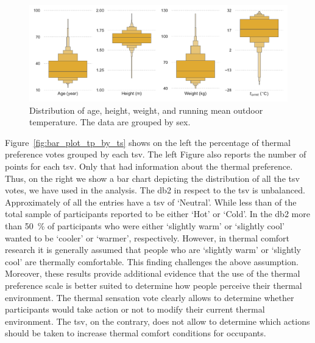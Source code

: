 \begin{figure}
    \centering
    \includegraphics[width=\textwidth]{figures/dist_other_data}
    \caption{Distribution of age, height, weight, and running mean outdoor temperature.
    The data are grouped by sex.}
    \label{fig:dist_other_data}
\end{figure}

Figure~\ref{fig:bar_plot_tp_by_ts} shows on the left the percentage of thermal preference votes grouped by each \ac{tsv}.
The left Figure also reports the number of points for each \ac{tsv}.
Only  that had information about the thermal preference.
Thus, on the right we show a bar chart depicting the distribution of all the \ac{tsv} votes, we have used in the analysis.
The \gls{db2} in respect to the \ac{tsv} is unbalanced.
Approximately  of all the entries have a \ac{tsv} of `Neutral'.
While less than  of the total sample of participants reported to be either `Hot' or `Cold'.
In the \gls{db2} more than \qty{50}{\percent} of participants who were either `slightly warm' or `slightly cool' wanted to be `cooler' or `warmer', respectively.
However, in thermal comfort research it is generally assumed that people who are `slightly warm' or `slightly cool' are thermally comfortable.
This finding challenges the above assumption.
Moreover, these results provide additional evidence that the use of the thermal preference scale is better suited to determine how people perceive their thermal environment.
The thermal sensation vote clearly allows to determine whether participants would take action or not to modify their current thermal environment.
The \ac{tsv}, on the contrary, does not allow to determine which actions should be taken to increase thermal comfort conditions for occupants.

